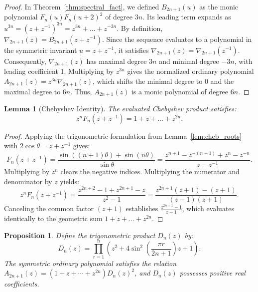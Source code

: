 \documentclass[11pt]{article}
\newtheorem{lemma}[theorem]{Lemma}
\newtheorem{proposition}[theorem]{Proposition}
\begin{document}
\begin{proof}
In Theorem~\ref{thm:spectral_fact}, we defined $B_{2n+1}(u)$ as the monic polynomial $F_n(u)F_n(u+2)^2$ of degree $3n$. Its leading term expands as $u^{3n} = (z+z^{-1})^{3n} = z^{3n} + \dots + z^{-3n}$. By definition, $\nabla_{2n+1}(z) = B_{2n+1}(z+z^{-1})$. Since the sequence evaluates to a polynomial in the symmetric invariant $u = z+z^{-1}$, it satisfies $\nabla_{2n+1}(z) = \nabla_{2n+1}(z^{-1})$. Consequently, $\nabla_{2n+1}(z)$ has maximal degree $3n$ and minimal degree $-3n$, with leading coefficient 1. Multiplying by $z^{3n}$ gives the normalized ordinary polynomial $A_{2n+1}(z) = z^{3n}\nabla_{2n+1}(z)$, which shifts the minimal degree to $0$ and the maximal degree to $6n$. Thus, $A_{2n+1}(z)$ is a monic polynomial of degree $6n$.
\end{proof}

\begin{lemma}[Chebyshev Identity]\label{lem:cheb_id}
The evaluated Chebyshev product satisfies:
\[
z^n F_n(z+z^{-1}) = 1 + z + \dots + z^{2n}.
\]
\end{lemma}
\begin{proof}
Applying the trigonometric formulation from Lemma~\ref{lem:cheb_roots} with $2\cos\theta = z+z^{-1}$ gives:
\[
F_n(z+z^{-1}) = \frac{\sin((n+1)\theta) + \sin(n\theta)}{\sin\theta} = \frac{z^{n+1}-z^{-(n+1)} + z^n - z^{-n}}{z-z^{-1}}.
\]
Multiplying by $z^n$ clears the negative indices. Multiplying the numerator and denominator by $z$ yields:
\[
z^n F_n(z+z^{-1}) = \frac{z^{2n+2} - 1 + z^{2n+1} - z}{z^2-1} = \frac{z^{2n+1}(z+1) - (z+1)}{(z-1)(z+1)}.
\]
Canceling the common factor $(z+1)$ establishes $\frac{z^{2n+1}-1}{z-1}$, which evaluates identically to the geometric sum $1 + z + \dots + z^{2n}$.
\end{proof}

\begin{proposition}\label{prop:geom}
Define the trigonometric product $D_n(z)$ by:
\begin{equation}
D_n(z) = \prod_{r=1}^n \left(z^2 + 4\sin^2\left(\frac{\pi r}{2n+1}\right)z + 1\right).
\end{equation}
The symmetric ordinary polynomial satisfies the relation $A_{2n+1}(z) = (1+z+\cdots+z^{2n})D_n(z)^2$, and $D_n(z)$ possesses positive real coefficients.
\end{proposition}
\end{document}
